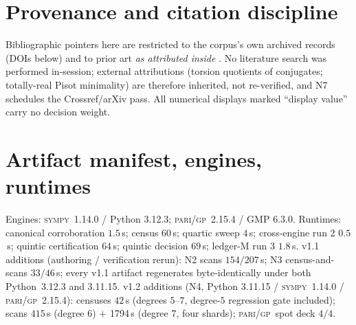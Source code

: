 \documentclass[11pt]{article}
\newcommand{\gp}{\textsc{pari/gp}}
\newcommand{\sy}{\textsc{sympy}}
\theoremstyle{definition}
\begin{document}
\section{Provenance and citation discipline}\label{sec:provenance}

Bibliographic pointers here are restricted to the corpus's own archived records
(DOIs below) and to prior art \emph{as attributed inside}
\cite[Rem.~7.20 and refs.~14--16]{relcharge}. No literature search was performed
in-session; external attributions (torsion quotients of conjugates; totally-real
Pisot minimality) are therefore inherited, not re-verified, and N7 schedules the
Crossref/arXiv pass. All numerical displays marked ``display value'' carry no
decision weight.

\appendix

\section{Artifact manifest, engines, runtimes}\label{app:manifest}

Engines: \sy~1.14.0 / Python 3.12.3; \gp~2.15.4 / GMP 6.3.0. Runtimes:
canonical corroboration $1.5$\,s; census $60$\,s; quartic sweep $4$\,s;
cross-engine run 2 $0.5$\,s; quintic certification $64$\,s; quintic decision
$69$\,s; ledger-M run 3 $1.8$\,s. v1.1 additions (authoring / verification
rerun): N2 scans $154/207$\,s; N3 census-and-scans $33/46$\,s; every v1.1
artifact regenerates byte-identically under both Python~3.12.3 and 3.11.15.
v1.2 additions (N4, Python 3.11.15 / \sy~1.14.0 / \gp~2.15.4): censuses
$42$\,s (degrees $5$--$7$, degree-$5$ regression gate included); scans
$415$\,s (degree $6$) $+$ 1794\,s (degree $7$, four shards); \gp\ spot
deck $4/4$.
\end{document}
